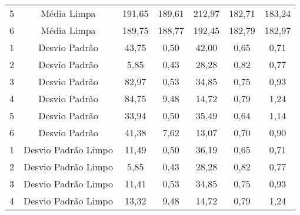 \begin{table}[]
\begin{tabular}{|c|c|ccccc|}
5              & Média Limpa                                                                & 191,65            & 189,61            & 212,97            & 182,71            & 183,24            \\
6              & Média Limpa                                                                & 189,75            & 188,77            & 192,45            & 182,79            & 182,97            \\ \hline
1              & Desvio Padrão                                                              & 43,75             & 0,50              & 42,00             & 0,65              & 0,71              \\
2              & Desvio Padrão                                                              & 5,85              & 0,43              & 28,28             & 0,82              & 0,77              \\
3              & Desvio Padrão                                                              & 82,97             & 0,53              & 34,85             & 0,75              & 0,93              \\
4              & Desvio Padrão                                                              & 84,75             & 9,48              & 14,72             & 0,79              & 1,24              \\
5              & Desvio Padrão                                                              & 33,94             & 0,50              & 35,49             & 0,64              & 1,14              \\
6              & Desvio Padrão                                                              & 41,38             & 7,62              & 13,07             & 0,70              & 0,90              \\ \hline
1              & Desvio Padrão Limpo                                                        & 11,49             & 0,50              & 36,19             & 0,65              & 0,71              \\
2              & Desvio Padrão Limpo                                                        & 5,85              & 0,43              & 28,28             & 0,82              & 0,77              \\
3              & Desvio Padrão Limpo                                                        & 11,41             & 0,53              & 34,85             & 0,75              & 0,93              \\
4              & Desvio Padrão Limpo                                                        & 13,32             & 9,48              & 14,72             & 0,79              & 1,24              \\

\end{tabular}
\end{table}
